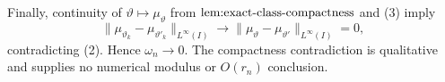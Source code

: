 Finally, continuity of \(\vartheta\mapsto\mu_\vartheta\) from
\(\textnormal{lem:exact-class-compactness}\) and (3) imply
\[
 \|\mu_{\vartheta_k}-\mu_{\vartheta'_k}\|_{L^\infty(I)}
 \longrightarrow
 \|\mu_\vartheta-\mu_{\vartheta'}\|_{L^\infty(I)}=0,
\]
contradicting (2).  Hence \(\omega_n\to0\).  The compactness contradiction
is qualitative and supplies no numerical modulus or \(O(r_n)\) conclusion.
